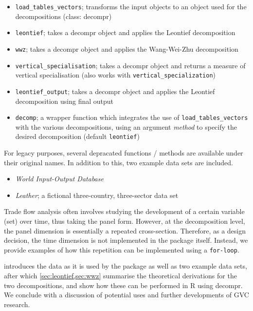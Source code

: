 \documentclass[a4paper]{article}\usepackage[]{graphicx}\usepackage[]{color}
\begin{document}
\begin{itemize}
 \item \verb!load_tables_vectors!; transforms the input objects to an object used for the decompositions (class: decompr)
 \item \verb!leontief!; takes a decompr object and applies the Leontief decomposition
 \item \verb!wwz!; takes a decompr object and applies the Wang-Wei-Zhu decomposition
 \item \verb!vertical_specialisation!; takes a decompr object and returns a measure of vertical specialisation (also works with \verb!vertical_specialization!)
 \item \verb!leontief_output!; takes a decompr object and applies the Leontief decomposition using final output
 \item \verb!decomp!; a wrapper function which integrates the use of \verb!load_tables_vectors! with the various decompositions, using an argument \textit{method} to specify the desired decomposition (default \verb!leontief!) 
\end{itemize}

For legacy purposes, several depracated functions / methods are available under their original names.
In addition to this, two example data sets are included.

\begin{itemize}
  \item \textit{World Input-Output Database} \parencite{timmer2012world}
  \item \textit{Leather}; a fictional three-country, three-sector data set
\end{itemize}

Trade flow analysis often involves studying the development of a certain variable (set) over time, thus taking the panel form.
However, at the decomposition level, the panel dimension is essentially a repeated cross-section.
Therefore, as a design decision, the time dimension is not implemented in the package itself.
Instead, we provide examples of how this repetition can be implemented using a \verb!for-loop!.

 introduces the data as it is used by the package as well as two example data sets,
after which \cref{sec:leontief,sec:wwz} summarise the theoretical derivations for the two decompositions, and show how these can be performed in R using decompr.
We conclude with a discussion of potential uses and further developments of GVC research.
\end{document}
